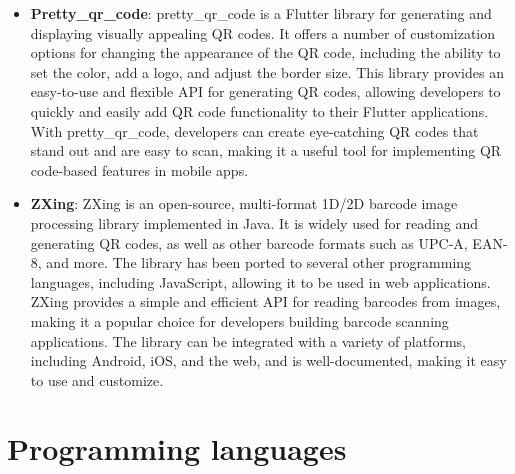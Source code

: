 \begin{itemize}
        \item \textbf{Pretty\_qr\_code}: pretty\_qr\_code is a Flutter library for generating and displaying visually appealing QR codes. It offers a number of customization options for changing the appearance of the QR code, including the ability to set the color, add a logo, and adjust the border size. This library provides an easy-to-use and flexible API for generating QR codes, allowing developers to quickly and easily add QR code functionality to their Flutter applications. With pretty\_qr\_code, developers can create eye-catching QR codes that stand out and are easy to scan, making it a useful tool for implementing QR code-based features in mobile apps.
        \item\textbf{ZXing}: ZXing is an open-source, multi-format 1D/2D barcode image processing library implemented in Java. It is widely used for reading and generating QR codes, as well as other barcode formats such as UPC-A, EAN-8, and more. The library has been ported to several other programming languages, including JavaScript, allowing it to be used in web applications. ZXing provides a simple and efficient API for reading barcodes from images, making it a popular choice for developers building barcode scanning applications. The library can be integrated with a variety of platforms, including Android, iOS, and the web, and is well-documented, making it easy to use and customize.
\end{itemize}
\clearpage
\section{Programming languages}
